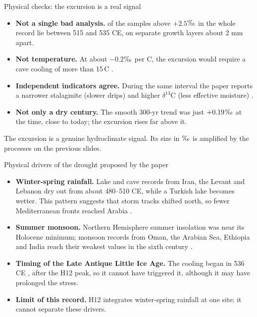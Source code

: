 \documentclass[aspectratio=169,11pt]{beamer}
\newcommand{\permil}{\ensuremath{\text{\textperthousand}}}
\begin{document}
\begin{frame}{Physical checks: the excursion is a real signal}
  \begin{itemize}\small\setlength{\itemsep}{4pt}
    \item \textbf{Not a single bad analysis.} \nNHighWindow{} of the
          \nNHighAll{} samples above $+2.5$\permil{} in the whole record lie
          between 515 and 535 CE, on separate growth layers about 2 mm
          apart.
    \item \textbf{Not temperature.} At about $-0.2$\permil{} per
          \textdegree C, the excursion would require a cave cooling of more
          than 15\,\textdegree C \citep{Lachniet2009}.
    \item \textbf{Independent indicators agree.} During the same interval
          the paper reports a narrower stalagmite (slower drips) and higher
          $\delta^{13}$C (less effective moisture)
          \citep{Fleitmann2022}.
    \item \textbf{Not only a dry century.} The smooth 300-yr trend was just
          $+0.19$\permil{} at the time, close to today; the excursion
          rises far above it.
  \end{itemize}
  \par\medskip
  \small The excursion is a genuine hydroclimate signal. Its size in
  \permil{} is amplified by the processes on the previous slides.
\end{frame}

\begin{frame}{Physical drivers of the drought proposed by the paper}
  \begin{itemize}\small\setlength{\itemsep}{4pt}
    \item \textbf{Winter-spring rainfall.} Lake and cave records from Iran,
          the Levant and Lebanon dry out from about 480--510 CE, while a
          Turkish lake becomes wetter. This pattern suggests that storm
          tracks shifted north, so fewer Mediterranean fronts reached
          Arabia \citep{Fleitmann2022}.
    \item \textbf{Summer monsoon.} Northern Hemisphere summer insolation was
          near its Holocene minimum; monsoon records from Oman, the Arabian
          Sea, Ethiopia and India reach their weakest values in the sixth
          century \citep{Fleitmann2022}.
    \item \textbf{Timing of the Late Antique Little Ice Age.} The cooling
          began in 536 CE \citep{Buntgen2016}, after the H12 peak, so it
          cannot have triggered it, although it may have prolonged the
          stress.
    \item \textbf{Limit of this record.} H12 integrates winter-spring
          rainfall at one site; it cannot separate these drivers.
  \end{itemize}
\end{frame}
\end{document}
